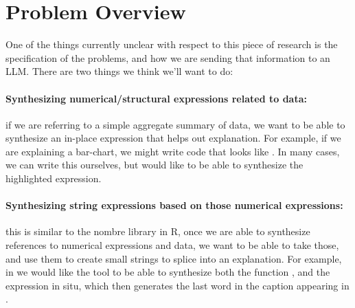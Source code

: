 \section{Problem Overview}
One of the things currently unclear with respect to this piece of research is the
specification of the problems, and how we are sending that information to an LLM.
There are two things we think we'll want to do:

\paragraph*{Synthesizing numerical/structural expressions related to data:}

if we are referring to a simple aggregate summary of data, we want to be able
to synthesize an in-place expression that helps out explanation. For example,
if we are explaining a bar-chart, we might write code that looks like .
In many cases, we can write this ourselves, but would like to be able to
synthesize the highlighted expression.

\paragraph*{Synthesizing string expressions based on those numerical expressions:}
this is similar to the nombre library in R, once we are able to synthesize references
to numerical expressions and data, we want to be able to take those, and use them to
create small strings to splice into an explanation. For example, in 
we would like the tool to be able to synthesize both the function , and
the expression in situ, which then generates the last word in the caption appearing in
.

